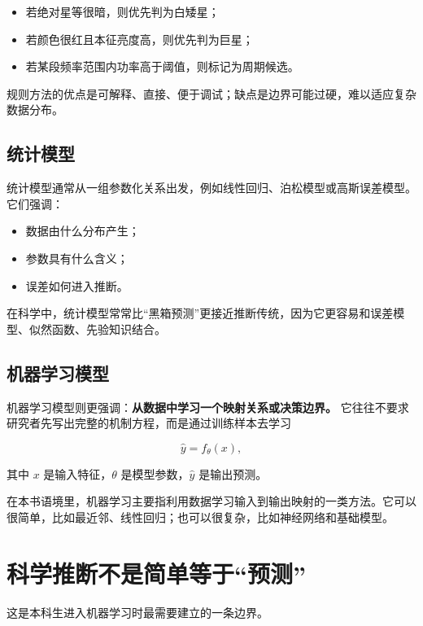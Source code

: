 \begin{itemize}
    \item 若绝对星等很暗，则优先判为白矮星；
    \item 若颜色很红且本征亮度高，则优先判为巨星；
    \item 若某段频率范围内功率高于阈值，则标记为周期候选。
\end{itemize}

规则方法的优点是可解释、直接、便于调试；缺点是边界可能过硬，难以适应复杂数据分布。

\subsection{统计模型}

统计模型通常从一组参数化关系出发，例如线性回归、泊松模型或高斯误差模型。它们强调：

\begin{itemize}
    \item 数据由什么分布产生；
    \item 参数具有什么含义；
    \item 误差如何进入推断。
\end{itemize}

在科学中，统计模型常常比“黑箱预测”更接近推断传统，因为它更容易和误差模型、似然函数、先验知识结合。

\subsection{机器学习模型}

机器学习模型则更强调：\textbf{从数据中学习一个映射关系或决策边界。}  
它往往不要求研究者先写出完整的机制方程，而是通过训练样本去学习

\[
\hat{y} = f_\theta(x),
\]

其中 $x$ 是输入特征，$\theta$ 是模型参数，$\hat{y}$ 是输出预测。

\begin{defbox}[本书中的机器学习]
在本书语境里，机器学习主要指利用数据学习输入到输出映射的一类方法。它可以很简单，比如最近邻、线性回归；也可以很复杂，比如神经网络和基础模型。
\end{defbox}

\section{科学推断不是简单等于“预测”}

这是本科生进入机器学习时最需要建立的一条边界。

